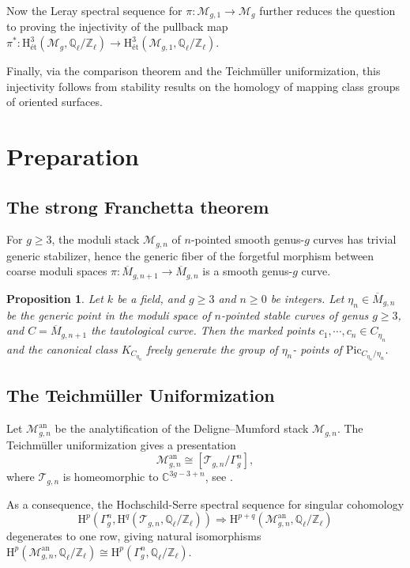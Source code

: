 \documentclass[12pt]{amsart}
\newtheorem{proposition}{Proposition}
\begin{document}
Now the Leray spectral sequence for $\pi\colon\mathcal{M}_{g,1}\to\mathcal{M}_g$ further reduces the question to proving the injectivity of the pullback map $\pi^*\colon\mathrm{H}^3_{\textrm{\'et}}(\mathcal{M}_g,\mathbb{Q}_\ell/\mathbb{Z}_\ell)\to \mathrm{H}^3_{\textrm{\'et}}(\mathcal{M}_{g,1},\mathbb{Q}_\ell/\mathbb{Z}_\ell).$ 

Finally, via the comparison theorem and the Teichm\"uller uniformization, this injectivity follows from stability results \cite[Theorem 1.2]{zbMATH06492666} on the homology of mapping class groups of oriented surfaces.


\section{Preparation}
\subsection{The strong Franchetta theorem}For $g\geq3$, the moduli stack $\mathcal{M}_{g,n}$ of $n$-pointed smooth genus-$g$ curves has trivial generic stabilizer, hence the generic fiber of the forgetful morphism between coarse moduli spaces $\pi\colon \overline{M}_{g,n+1}\to\overline{M}_{g,n}$ is a smooth genus-$g$ curve.
\begin{proposition}{\cite[Theorem 5.1]{zbMATH02078578}}\label{strong-franchetta}
Let $k$ be a field, and $g\geq3$ and $n\geq0$ be integers. Let $\eta_n\in\overline{M}_{g,n}$ be the generic point in the moduli space of $n$-pointed stable curves of genus $g\geq3$, and $C=\overline{M}_{g,n+1}$ the tautological curve. Then the marked points $c_1,\cdots,c_n\in C_{\eta_n}$ and the canonical class $K_{C_{\eta_n}}$ freely generate the group of $\eta_n$- points of $\mathrm{Pic}_{C_{\eta_n}/\eta_n}$.
\end{proposition}

\subsection{The Teichm\"uller Uniformization}\label{Teich}
Let $\mathcal{M}_{g,n}^{\mathrm{an}}$ be the analytification of the Deligne--Mumford stack $\mathcal{M}_{g,n}$. The Teichm\"uller uniformization gives a presentation $$\mathcal{M}^{\mathrm{an}}_{g,n}\cong[\mathcal{T}_{g,n}/\Gamma_g^n],$$
where $\mathcal{T}_{g,n}$ is homeomorphic to $\mathbb{C}^{3g-3+n}$, see \cite[Chapter XV]{zbMATH05798333}.


As a consequence, the Hochschild-Serre spectral sequence for singular cohomology $$\mathrm{H}^p(\Gamma_g^n,\mathrm{H}^q(\mathcal{T}_{g,n},\mathbb{Q}_\ell/\mathbb{Z}_\ell))\Rightarrow \mathrm{H}^{p+q}(\mathcal{M}_{g,n}^{\mathrm{an}},\mathbb{Q}_\ell/\mathbb{Z}_\ell)$$
degenerates to one row, giving natural isomorphisms $\mathrm{H}^p(\mathcal{M}_{g,n}^{\mathrm{an}},\mathbb{Q}_\ell/\mathbb{Z}_\ell)\cong\mathrm{H}^p(\Gamma_g^n,\mathbb{Q}_\ell/\mathbb{Z}_\ell).$
\end{document}
